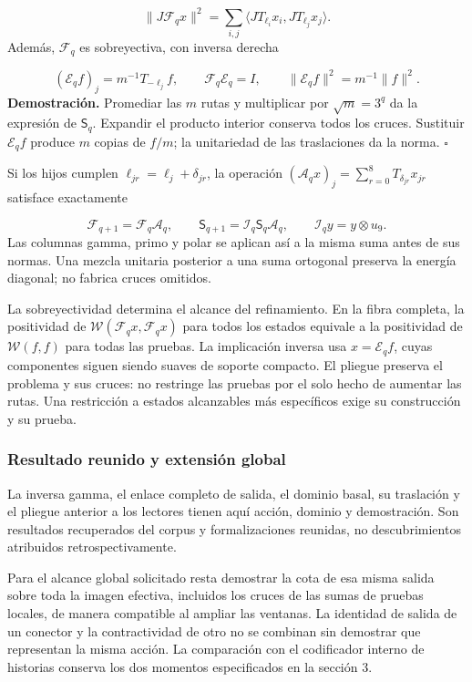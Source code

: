 \[
\|J\mathcal F_qx\|^2
=\sum_{i,j}\langle JT_{\ell_i}x_i,JT_{\ell_j}x_j\rangle.
\]
Además, \(\mathcal F_q\) es sobreyectiva, con inversa derecha

\[
(\mathcal E_qf)_j=m^{-1}T_{-\ell_j}f,\qquad
\mathcal F_q\mathcal E_q=I,\qquad
\|\mathcal E_qf\|^2=m^{-1}\|f\|^2.
\]
\textbf{Demostración.} Promediar las \(m\) rutas y multiplicar por \(\sqrt m=3^q\) da la expresión de \(\mathsf S_q\). Expandir el producto interior conserva todos los cruces. Sustituir \(\mathcal E_qf\) produce \(m\) copias de \(f/m\); la unitariedad de las traslaciones da la norma. \hfill\(\square\)

Si los hijos cumplen \(\ell_{jr}=\ell_j+\delta_{jr}\), la operación \((\mathcal A_qx)_j=\sum_{r=0}^8T_{\delta_{jr}}x_{jr}\) satisface exactamente

\[
\mathcal F_{q+1}=\mathcal F_q\mathcal A_q,\qquad
\mathsf S_{q+1}=\mathcal I_q\mathsf S_q\mathcal A_q,\qquad
\mathcal I_qy=y\otimes u_9.
\]
Las columnas gamma, primo y polar se aplican así a la misma suma antes de sus normas. Una mezcla unitaria posterior a una suma ortogonal preserva la energía diagonal; no fabrica cruces omitidos.

La sobreyectividad determina el alcance del refinamiento. En la fibra completa, la positividad de \(\mathscr W(\mathcal F_qx,\mathcal F_qx)\) para todos los estados equivale a la positividad de \(\mathscr W(f,f)\) para todas las pruebas. La implicación inversa usa \(x=\mathcal E_qf\), cuyas componentes siguen siendo suaves de soporte compacto. El pliegue preserva el problema y sus cruces: no restringe las pruebas por el solo hecho de aumentar las rutas. Una restricción a estados alcanzables más específicos exige su construcción y su prueba.

\subsubsection*{Resultado reunido y extensión global}
La inversa gamma, el enlace completo de salida, el dominio basal, su traslación y el pliegue anterior a los lectores tienen aquí acción, dominio y demostración. Son resultados recuperados del corpus y formalizaciones reunidas, no descubrimientos atribuidos retrospectivamente.

Para el alcance global solicitado resta demostrar la cota de esa misma salida sobre toda la imagen efectiva, incluidos los cruces de las sumas de pruebas locales, de manera compatible al ampliar las ventanas. La identidad de salida de un conector y la contractividad de otro no se combinan sin demostrar que representan la misma acción. La comparación con el codificador interno de historias conserva los dos momentos especificados en la sección 3.

